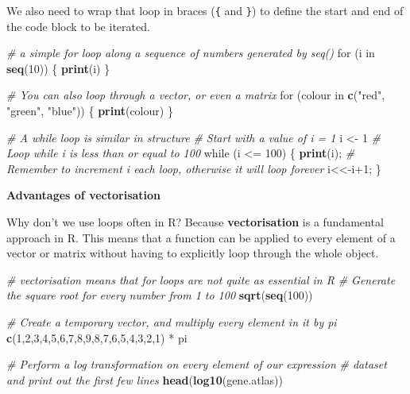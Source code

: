 \documentclass[a4paper]{book}
\newenvironment{Shaded}{\begin{snugshade}}{\end{snugshade}}
\newcommand{\KeywordTok}[1]{\textcolor[rgb]{0.13,0.29,0.53}{\textbf{{#1}}}}
\newcommand{\DecValTok}[1]{\textcolor[rgb]{0.00,0.00,0.81}{{#1}}}
\newcommand{\StringTok}[1]{\textcolor[rgb]{0.31,0.60,0.02}{{#1}}}
\newcommand{\CommentTok}[1]{\textcolor[rgb]{0.56,0.35,0.01}{\textit{{#1}}}}
\newcommand{\NormalTok}[1]{{#1}}
\renewenvironment{Shaded}
{\vspace{1.5em}\begin{leftbar}\begin{snugshade}}
{\end{snugshade}\end{leftbar}\vspace{3pt}}
\begin{document}
We also need to wrap that loop in braces (\texttt{\{} and \texttt{\}})
to define the start and end of the code block to be iterated.

\begin{Shaded}
\begin{Highlighting}[]
\CommentTok{# a simple for loop along a sequence of numbers generated by seq()}
\NormalTok{for (i in }\KeywordTok{seq}\NormalTok{(}\DecValTok{10}\NormalTok{)) \{}
  \KeywordTok{print}\NormalTok{(i)}
\NormalTok{\}}

\CommentTok{# You can also loop through a vector, or even a matrix}
\NormalTok{for (colour in }\KeywordTok{c}\NormalTok{(}\StringTok{"red"}\NormalTok{, }\StringTok{"green"}\NormalTok{, }\StringTok{"blue"}\NormalTok{)) \{}
  \KeywordTok{print}\NormalTok{(colour)}
\NormalTok{\}}

\CommentTok{# A while loop is similar in structure}
\CommentTok{# Start with a value of i = 1}
\NormalTok{i <-}\StringTok{ }\DecValTok{1}
\CommentTok{# Loop while i is less than or equal to 100}
\NormalTok{while (i <=}\StringTok{ }\DecValTok{100}\NormalTok{) \{}
  \KeywordTok{print}\NormalTok{(i);}
  \CommentTok{# Remember to increment i each loop, otherwise it will loop forever}
  \NormalTok{i<<-i}\DecValTok{+1}\NormalTok{;}
\NormalTok{\}}
\end{Highlighting}
\end{Shaded}

\textbf{Advantages of vectorisation}

Why don't we use loops often in R? Because \textbf{vectorisation} is a
fundamental approach in R. This means that a function can be applied to
every element of a vector or matrix without having to explicitly loop
through the whole object.

\begin{Shaded}
\begin{Highlighting}[]
\CommentTok{# vectorisation means that for loops are not quite as essential in R}
\CommentTok{# Generate the square root for every number from 1 to 100}
\KeywordTok{sqrt}\NormalTok{(}\KeywordTok{seq}\NormalTok{(}\DecValTok{100}\NormalTok{))}

\CommentTok{# Create a temporary vector, and multiply every element in it by pi}
\KeywordTok{c}\NormalTok{(}\DecValTok{1}\NormalTok{,}\DecValTok{2}\NormalTok{,}\DecValTok{3}\NormalTok{,}\DecValTok{4}\NormalTok{,}\DecValTok{5}\NormalTok{,}\DecValTok{6}\NormalTok{,}\DecValTok{7}\NormalTok{,}\DecValTok{8}\NormalTok{,}\DecValTok{9}\NormalTok{,}\DecValTok{8}\NormalTok{,}\DecValTok{7}\NormalTok{,}\DecValTok{6}\NormalTok{,}\DecValTok{5}\NormalTok{,}\DecValTok{4}\NormalTok{,}\DecValTok{3}\NormalTok{,}\DecValTok{2}\NormalTok{,}\DecValTok{1}\NormalTok{) *}\StringTok{ }\NormalTok{pi}

\CommentTok{# Perform a log transformation on every element of our expression}
\CommentTok{# dataset and print out the first few lines}
\KeywordTok{head}\NormalTok{(}\KeywordTok{log10}\NormalTok{(gene.atlas))}
\end{Highlighting}
\end{Shaded}
\end{document}
